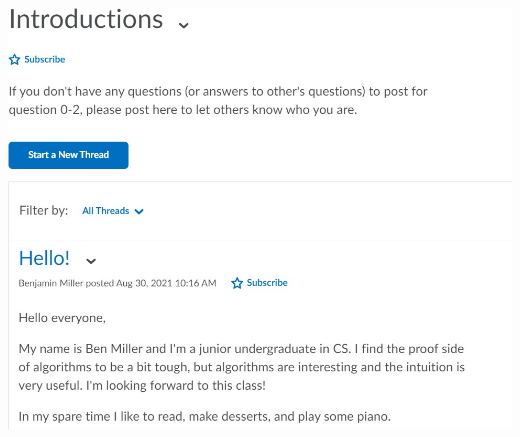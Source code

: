 \documentclass{article}
\begin{document}
\includegraphics{post_screenshot.jpg}


\collab{}
\end{document}
